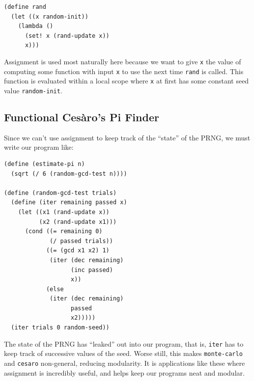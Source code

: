 \documentclass[9pt]{report}
\begin{document}
\begin{verbatim}
(define rand
  (let ((x random-init))
    (lambda ()
      (set! x (rand-update x))
      x)))
\end{verbatim}

Assignment is used most naturally here because we want to give \texttt{x}
the value of computing some function with input \texttt{x} to use the
next time \texttt{rand} is called. This function is evaluated within a
local scope where \texttt{x} at first has some constant seed value
\texttt{random-init}.


\subsection{Functional Cesàro's Pi Finder}
\label{sec:orgcf63731}

Since we can't use assignment to keep track of the ``state'' of the
PRNG, we must write our program like:

\begin{verbatim}
(define (estimate-pi n)
  (sqrt (/ 6 (random-gcd-test n))))

(define (random-gcd-test trials)
  (define (iter remaining passed x)
    (let ((x1 (rand-update x))
          (x2 (rand-update x1)))
      (cond ((= remaining 0)
             (/ passed trials))
            ((= (gcd x1 x2) 1)
             (iter (dec remaining)
                   (inc passed)
                   x))
            (else
             (iter (dec remaining)
                   passed
                   x2)))))
  (iter trials 0 random-seed))
\end{verbatim}

The state of the PRNG has ``leaked'' out into our program, that is,
\texttt{iter} has to keep track of successive values of the seed. Worse
still, this makes \texttt{monte-carlo} and \texttt{cesaro} non-general, reducing
modularity. It is applications like these where assignment is
incredibly useful, and helps keep our programs neat and modular.
\end{document}
